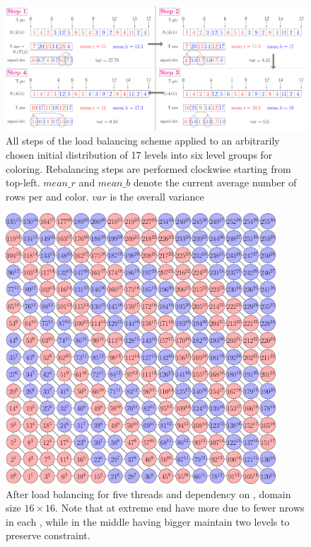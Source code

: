    \begin{figure}[tbhp]
   	\centering
   	\includegraphics[height=0.22\textheight,width=\textwidth]{pics/load_balancing/lb_alg/lb_all}
   	\caption{All steps of the load balancing scheme applied to an arbitrarily chosen initial distribution of 17 levels into six level groups for \DTWO coloring. Rebalancing steps are performed clockwise starting from top-left. $mean\_r$ and $mean\_b$ denote the current average number of rows per \levelGroup and color. $var$ is the overall  variance}
   	\label{fig:lb_alg}
   \end{figure}
   
    
    \begin{figure}
      \begin{minipage}[c]{0.63\textwidth}
      	\includegraphics[height=0.26\textheight,width=0.9\textwidth]{pics/load_balancing/2d-7pt/stencil_2d_7pt}
      \end{minipage}\hfill
      \begin{minipage}[c]{0.34\textwidth}
      	\caption{After load balancing for five threads and \DTWO dependency on \stex, domain size $16 \times 16$. Note that \levelGroups at extreme end have more \levels due to fewer \acrshort{nrows} in each \level, while \levelGroups in the middle having bigger \levels maintain two levels to preserve \DTWO constraint.
      	} \label{fig:2d_7pt_lb}
      \end{minipage}
     \end{figure}
  
